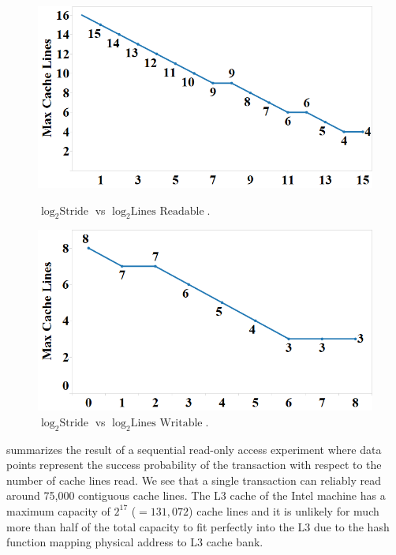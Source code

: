 \begin{figure}[h]
\centering
\begin{minipage}[b]{.45\linewidth}
\centering
\includegraphics[width=\linewidth]{images/wttm_stride_read_intel}
\caption{$\log_2{\textrm{Stride}}$ vs $\log_2{\textrm{Lines Readable}}$.}
\label{fig:wttm_stride_read_intel}
\end{minipage}%
\quad
\begin{minipage}[b]{.45\linewidth}
\centering
\includegraphics[width=\linewidth]{images/wttm_stride_write_intel}
\caption{$\log_2{\textrm{Stride}}$ vs $\log_2{\textrm{Lines Writable}}$.}
\label{fig:wttm_stride_write_intel}
\end{minipage}
\end{figure}

 summarizes the result of a sequential
read-only access experiment where data points represent the success
probability of the transaction with respect to the 
number of cache lines read.  We see that a 
single transaction can reliably read 
around 75,000 contiguous cache lines. 
The {L3} cache of the Intel machine has a maximum
capacity of $2^{17}$ ($=131,072$) cache lines and it is unlikely
for much more than half of the total capacity to 
fit perfectly into the {L3} due to
the hash function mapping physical address to L3 cache bank. 

